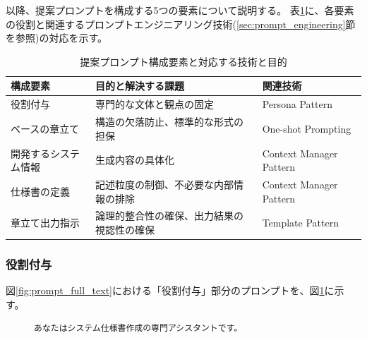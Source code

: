 
以降、提案プロンプトを構成する5つの要素について説明する。
表\ref{tb:prompt_elements_summary}に、各要素の役割と関連するプロンプトエンジニアリング技術(\ref{sec:prompt_engineering}節を参照)の対応を示す。

\begin{table}[tp]
  \caption{提案プロンプト構成要素と対応する技術と目的}
  \label{tb:prompt_elements_summary}
  \centering
  \small
  \begin{tabular}{|l|p{8cm}|l|} %
    \hline
    \textbf{構成要素} & \textbf{目的と解決する課題} & \textbf{関連技術} \\
    \hline
    役割付与 & 専門的な文体と観点の固定 & Persona Pattern \\
    \hline
    ベースの章立て & 構造の欠落防止、標準的な形式の担保 & One-shot Prompting \\
    \hline
    開発するシステム情報 & 生成内容の具体化 & Context Manager Pattern \\
    \hline
    仕様書の定義 & 記述粒度の制御、不必要な内部情報の排除 & Context Manager Pattern \\
    \hline
    章立て出力指示 & 論理的整合性の確保、出力結果の視認性の確保 & Template Pattern \\
    \hline
  \end{tabular}
\end{table}

\subsubsection{役割付与}

図\ref{fig:prompt_full_text}における「役割付与」部分のプロンプトを、図\ref{fig:role_assignment}に示す。

\begin{figure}[tp]
\vspace{9mm}
\begin{tcolorbox}[
  colback=white,
  colframe=blue,
  fonttitle=\bfseries,
]
\footnotesize
\ttfamily
\fontsize{10}{11}\selectfont
\begin{verbatim}
あなたはシステム仕様書作成の専門アシスタントです。
\end{verbatim}
\end{tcolorbox}
\label{fig:role_assignment}
\end{figure}

